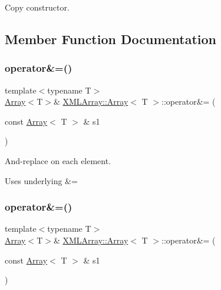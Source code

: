 Copy constructor. 



\subsection{Member Function Documentation}
\mbox{\label{classXMLArray_1_1Array_a7a015abc3dfa498a8feb234b51d4c341}} 
\subsubsection{\texorpdfstring{operator\&=()}{operator\&=()}\hspace{0.1cm}{\footnotesize\ttfamily [1/4]}}
{\footnotesize\ttfamily template$<$typename T$>$ \\
\mbox{\hyperlink{classXMLArray_1_1Array}{Array}}$<$T$>$\& \mbox{\hyperlink{classXMLArray_1_1Array}{X\+M\+L\+Array\+::\+Array}}$<$ T $>$\+::operator\&= (\begin{DoxyParamCaption}\item[{const \mbox{\hyperlink{classXMLArray_1_1Array}{Array}}$<$ T $>$ \&}]{s1 }\end{DoxyParamCaption})\hspace{0.3cm}{\ttfamily [inline]}}



And-\/replace on each element. 

Uses underlying \&= \mbox{\label{classXMLArray_1_1Array_a7a015abc3dfa498a8feb234b51d4c341}} 
\subsubsection{\texorpdfstring{operator\&=()}{operator\&=()}\hspace{0.1cm}{\footnotesize\ttfamily [2/4]}}
{\footnotesize\ttfamily template$<$typename T$>$ \\
\mbox{\hyperlink{classXMLArray_1_1Array}{Array}}$<$T$>$\& \mbox{\hyperlink{classXMLArray_1_1Array}{X\+M\+L\+Array\+::\+Array}}$<$ T $>$\+::operator\&= (\begin{DoxyParamCaption}\item[{const \mbox{\hyperlink{classXMLArray_1_1Array}{Array}}$<$ T $>$ \&}]{s1 }\end{DoxyParamCaption})\hspace{0.3cm}{\ttfamily [inline]}}



